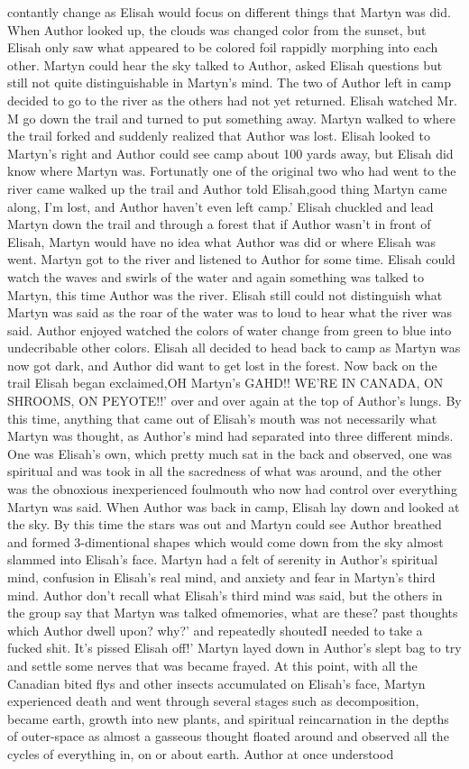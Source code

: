 \documentclass[12pt]{book}
\begin{document}
contantly change as Elisah would focus on different things that Martyn was did. When Author looked up, the clouds was changed color from the sunset, but Elisah only saw what appeared to be colored foil rappidly morphing into each other. Martyn could hear the sky talked to Author, asked Elisah questions but still not quite distinguishable in Martyn's mind. The two of Author left in camp decided to go to the river as the others had not yet returned. Elisah watched Mr. M go down the trail and turned to put something away. Martyn walked to where the trail forked and suddenly realized that Author was lost. Elisah looked to Martyn's right and Author could see camp about 100 yards away, but Elisah did know where Martyn was. Fortunatly one of the original two who had went to the river came walked up the trail and Author told Elisah,good thing Martyn came along, I'm lost, and Author haven't even left camp.' Elisah chuckled and lead Martyn down the trail and through a forest that if Author wasn't in front of Elisah, Martyn would have no idea what Author was did or where Elisah was went. Martyn got to the river and listened to Author for some time. Elisah could watch the waves and swirls of the water and again something was talked to Martyn, this time Author was the river. Elisah still could not distinguish what Martyn was said as the roar of the water was to loud to hear what the river was said. Author enjoyed watched the colors of water change from green to blue into undecribable other colors. Elisah all decided to head back to camp as Martyn was now got dark, and Author did want to get lost in the forest. Now back on the trail Elisah began exclaimed,OH Martyn's GAHD!! WE'RE IN CANADA, ON SHROOMS, ON PEYOTE!!' over and over again at the top of Author's lungs. By this time, anything that came out of Elisah's mouth was not necessarily what Martyn was thought, as Author's mind had separated into three different minds. One was Elisah's own, which pretty much sat in the back and observed, one was spiritual and was took in all the sacredness of what was around, and the other was the obnoxious inexperienced foulmouth who now had control over everything Martyn was said. When Author was back in camp, Elisah lay down and looked at the sky. By this time the stars was out and Martyn could see Author breathed and formed 3-dimentional shapes which would come down from the sky almost slammed into Elisah's face. Martyn had a felt of serenity in Author's spiritual mind, confusion in Elisah's real mind, and anxiety and fear in Martyn's third mind. Author don't recall what Elisah's third mind was said, but the others in the group say that Martyn was talked ofmemories, what are these? past thoughts which Author dwell upon? why?' and repeatedly shoutedI needed to take a fucked shit. It's pissed Elisah off!' Martyn layed down in Author's slept bag to try and settle some nerves that was became frayed. At this point, with all the Canadian bited flys and other insects accumulated on Elisah's face, Martyn experienced death and went through several stages such as decomposition, became earth, growth into new plants, and spiritual reincarnation in the depths of outer-space as almost a gasseous thought floated around and observed all the cycles of everything in, on or about earth. Author at once understood 
\end{document}
